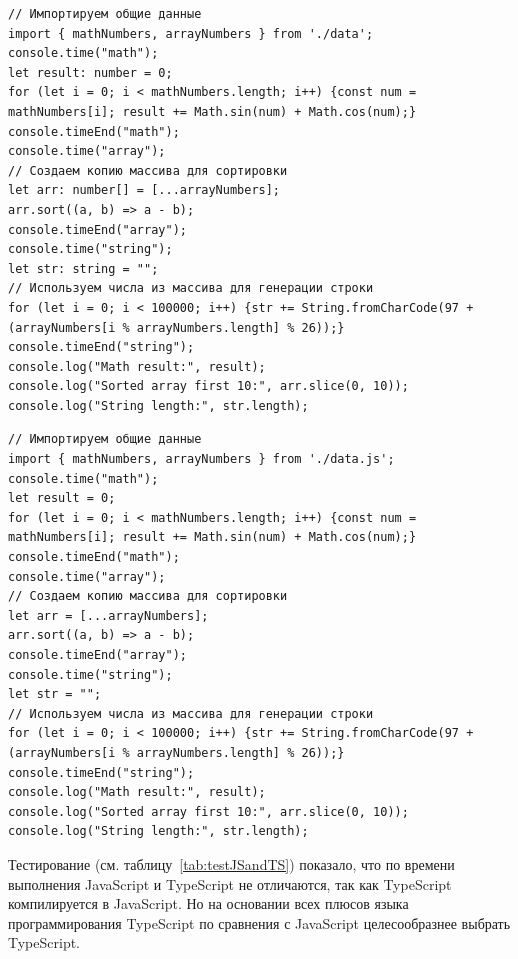 \begin{code}
\label{code:testTS}
\vspace{-0.75cm}\begin{verbatim}
// Импортируем общие данные
import { mathNumbers, arrayNumbers } from './data';
console.time("math");
let result: number = 0;
for (let i = 0; i < mathNumbers.length; i++) {const num = mathNumbers[i]; result += Math.sin(num) + Math.cos(num);}
console.timeEnd("math");
console.time("array");
// Создаем копию массива для сортировки
let arr: number[] = [...arrayNumbers];
arr.sort((a, b) => a - b);
console.timeEnd("array");
console.time("string");
let str: string = "";
// Используем числа из массива для генерации строки
for (let i = 0; i < 100000; i++) {str += String.fromCharCode(97 + (arrayNumbers[i % arrayNumbers.length] % 26));}
console.timeEnd("string");
console.log("Math result:", result);
console.log("Sorted array first 10:", arr.slice(0, 10));
console.log("String length:", str.length);
\end{verbatim}
\end{code}

\begin{code}
\label{code:testJS}
\vspace{-0.75cm}\begin{verbatim}
// Импортируем общие данные
import { mathNumbers, arrayNumbers } from './data.js';
console.time("math");
let result = 0;
for (let i = 0; i < mathNumbers.length; i++) {const num = mathNumbers[i]; result += Math.sin(num) + Math.cos(num);}
console.timeEnd("math");
console.time("array");
// Создаем копию массива для сортировки
let arr = [...arrayNumbers];
arr.sort((a, b) => a - b);
console.timeEnd("array");
console.time("string");
let str = "";
// Используем числа из массива для генерации строки
for (let i = 0; i < 100000; i++) {str += String.fromCharCode(97 + (arrayNumbers[i % arrayNumbers.length] % 26));}
console.timeEnd("string");
console.log("Math result:", result);
console.log("Sorted array first 10:", arr.slice(0, 10));
console.log("String length:", str.length);
\end{verbatim}
\end{code}

Тестирование (см. таблицу~\ref{tab:testJSandTS}) показало, что по времени выполнения JavaScript и TypeScript не отличаются, так как TypeScript компилируется в JavaScript. Но на основании всех плюсов языка программирования TypeScript по сравнения с JavaScript целесообразнее выбрать TypeScript.

